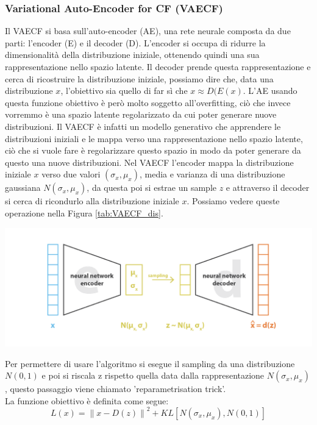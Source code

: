 \subsubsection{Variational Auto-Encoder for CF (VAECF)}
Il VAECF si basa sull'auto-encoder (AE), una rete neurale composta da due parti: l'encoder (E) e il decoder (D).
L'encoder si occupa di ridurre la dimensionalità della distribuzione iniziale, ottenendo quindi una sua rappresentazione nello spazio latente. Il decoder prende questa rappresentazione e cerca di ricostruire la distribuzione iniziale, possiamo dire che, data una distribuzione $x$, l'obiettivo sia quello di far sì che $x \approx D(E(x)$.
L'AE usando questa funzione obiettivo è però molto soggetto all'overfitting, ciò che invece vorremmo è una spazio latente regolarizzato da cui poter generare nuove distribuzioni.
Il VAECF è infatti un modello generativo che apprendere le distribuzioni iniziali e le mappa verso una rappresentazione nello spazio latente, ciò che si vuole fare è regolarizzare questo spazio in modo da poter generare da questo una nuove distribuzioni. Nel VAECF l'encoder mappa la distribuzione iniziale $x$ verso due valori $(\sigma_x, \mu_x)$, media e varianza di una distribuzione gaussiana $N(\sigma_x, \mu_x)$, da questa poi si estrae un sample $z$ e attraverso il decoder si cerca di ricondurlo alla distribuzione iniziale $x$. Possiamo vedere queste operazione nella Figura \ref{tab:VAECF_dis}. 
\begin{center}
	\includegraphics[width=14.5cm]{figures/VAECF.png}
	\label{tab:VAECF_dis}
\end{center}
Per permettere di usare l'algoritmo  si esegue il sampling da una distribuzione $N(0,1)$ e poi si riscala z rispetto quella data dalla rappresentazione $N(\sigma_x, \mu_x)$, questo passaggio viene chiamato 'reparametrisation trick'.\\
La funzione obiettivo è definita come segue:
$$L(x) = \left\lVert x - D(z) \right\rVert^2 + KL[N(\sigma_x, \mu_x),N(0,1)]$$
